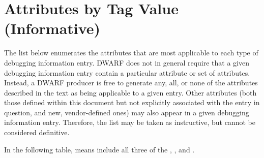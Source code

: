 \chapter[Attributes by Tag (Informative)]{Attributes by Tag Value (Informative)}
\label{chap:attributesbytagvalueinformative}

The list below enumerates the attributes that are
most applicable to each type of debugging information
entry. DWARF does not in general require that a given
debugging information entry contain a particular attribute
or set of attributes. Instead, a DWARF producer is free to
generate any, all, or none of the attributes described in the
text as being applicable to a given entry. Other attributes
(both those defined within this document but not explicitly
associated with the entry in question, and new, vendor-defined
ones) may also appear in a given debugging information
entry. Therefore, the list may be taken as instructive, but
cannot be considered definitive.  

In the following table,
means include all three of the
,
, and 
.

